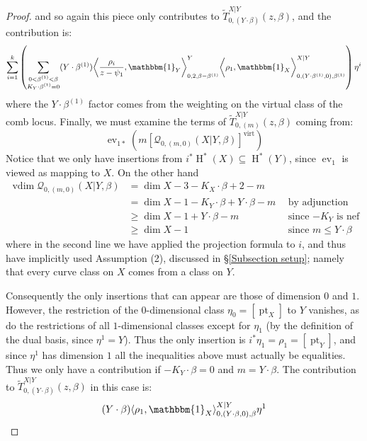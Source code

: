 \documentclass[10pt]{amsart}
\newcommand{\Q}[4]{\mathcal{Q}_{#1,#2}(#3,#4)}
\newcommand{\virt}[1]{[#1]^{\operatorname{virt}}}
\newcommand{\HH}{\operatorname{H}}
\newcommand{\pt}{\operatorname{pt}}
\newcommand{\ev}{\operatorname{ev}}
\newcommand{\vdim}{\operatorname{vdim}}
\theoremstyle{definition}
\theoremstyle{definition}
\begin{document}
\begin{proof}
and so again this piece only contributes to $\widetilde{T}_{0,(Y\cdot\beta)}^{X|Y}(z,\beta)$, and the contribution is:
\begin{equation*} \sum_{i=1}^k \left( \sum_{\substack{0 < \beta^{(1)} < \beta \\ K_Y \cdot \beta^{(1)}=0}} (Y \cdot \beta^{(1)}) \bigg\langle \dfrac{\rho_i}{z-\psi_1}, \mathbbm{1}_Y \bigg\rangle_{0,2,\beta-\beta^{(1)}}^Y \bigg\langle \rho_1, \mathbbm{1}_X \bigg\rangle_{0,(Y \cdot \beta^{(1)},0),\beta^{(1)}}^{X|Y} \right) \eta^i \end{equation*}
where the $Y \cdot \beta^{(1)}$ factor comes from the weighting on the virtual class of the comb locus. Finally, we must examine the terms of $\widetilde{T}_{0,(m)}^{X|Y}(z,\beta)$ coming from:
\begin{equation*}\ev_{1*}(m\virt{\Q{0}{(m,0)}{X|Y}{\beta}})\end{equation*} 
Notice that we only have insertions from $i^*\HH^*(X) \subseteq \HH^*(Y)$, since $\ev_1$ is viewed as mapping to $X$. On the other hand
\begin{align*} \vdim \Q{0}{(m,0)}{X|Y}{\beta} & = \dim X-3 -K_X \cdot \beta +2-m & \\
& = \dim X - 1 -K_Y \cdot \beta + Y \cdot \beta - m \ \ & \text{by adjunction} \\
& \geq \dim X - 1 + Y\cdot\beta - m \ \ & \text{since $-K_Y$ is nef} \\
& \geq \dim X - 1 \ \ & \text{since $m \leq Y \cdot \beta$} \end{align*}
where in the second line we have applied the projection formula to $i$, and thus have implicitly used Assumption (2), discussed in \S \ref{Subsection setup}; namely that every curve class on $X$ comes from a class on $Y$.

Consequently the only insertions that can appear are those of dimension $0$ and $1$. However, the restriction of the $0$-dimensional class $\eta_0 = [\pt_X]$ to $Y$ vanishes, as do the restrictions of all $1$-dimensional classes except for $\eta_1$ (by the definition of the dual basis, since $\eta^1 = Y$). Thus the only insertion is $i^*\eta_1=\rho_1=[\pt_Y]$, and since $\eta^1$ has dimension $1$ all the inequalities above must actually be equalities. Thus we only have a contribution if $-K_Y \cdot \beta = 0$ and $m = Y \cdot \beta$. The contribution to $\widetilde{T}_{0,(Y\cdot\beta)}^{X|Y}(z,\beta)$ in this case is:
\begin{equation*} (Y \cdot \beta) \langle \rho_1 , \mathbbm{1}_X \rangle_{0,(Y \cdot \beta,0),\beta}^{X|Y} \eta^1 \end{equation*}


\end{proof}
\end{document}
